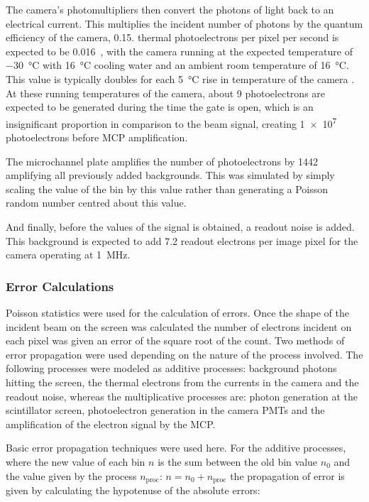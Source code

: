 The camera's photomultipliers then convert the photons of light back to an
electrical current. This multiplies the incident number of photons by the
quantum efficiency of the camera, \num{0.15}. %
thermal photoelectrons per pixel per second is expected to be
\num{0.016}~\cite{istarscmos}, with the camera running at the expected
temperature of \SI{-30}{\celsius} with \SI{16}{\celsius} cooling water and an
ambient room temperature of \SI{16}{\celsius}. This value is typically doubles
for each \SI{5}{\celsius} rise in temperature of the camera \cite{istarscmos}.
At these running temperatures of the camera, about 9 photoelectrons are expected
to be generated during the time the gate is open, which is an insignificant
proportion in comparison to the beam signal, creating \num{1e7} photoelectrons
before MCP amplification.

The microchannel plate amplifies the number of photoelectrons by \num{1442}
amplifying all previously added backgrounds.
This was simulated by simply scaling the value of the bin by this value rather
than generating a Poisson random number centred about this value.

And finally, before the values of the signal is obtained, a readout noise is
added. This background is expected to add \num{7.2} readout electrons per image
pixel for the camera operating at \SI{1}{\mega\hertz}.

\subsubsection{Error Calculations}

Poisson statistics were used for the calculation of errors.  Once the shape of
the incident beam on the screen was calculated the number of electrons incident
on each pixel was given an error of the square root of the count. Two methods of
error propagation were used depending on the nature of the process involved.
The following processes were modeled as additive processes: background photons
hitting the screen, the thermal electrons from the currents in the camera and
the readout noise, whereas the multiplicative processes are: photon generation
at the scintillator screen, photoelectron generation in the camera PMTs and the
amplification of the electron signal by the MCP.

Basic error propagation techniques were used here. For the additive processes,
where the new value of each bin $n$ is the sum between the old bin value $n_0$
and the value given by the process $n_\text{proc}$: $n=n_0+n_\text{proc}$ the
propagation of error is given by calculating the hypotenuse of the absolute
errors:

